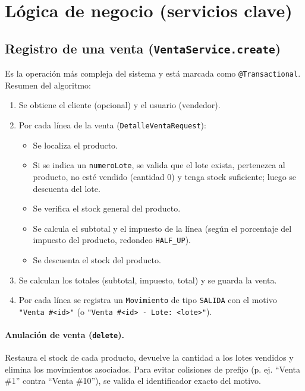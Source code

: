 \documentclass[11pt,a4paper]{article}
\begin{document}
\section{Lógica de negocio (servicios clave)}

\subsection{Registro de una venta (\texttt{VentaService.create})}

Es la operación más compleja del sistema y está marcada como
\texttt{@Transactional}. Resumen del algoritmo:

\begin{enumerate}[noitemsep]
    \item Se obtiene el cliente (opcional) y el usuario (vendedor).
    \item Por cada línea de la venta (\texttt{DetalleVentaRequest}):
    \begin{itemize}[noitemsep]
        \item Se localiza el producto.
        \item Si se indica un \texttt{numeroLote}, se valida que el lote
              exista, pertenezca al producto, no esté vendido (cantidad 0) y
              tenga stock suficiente; luego se descuenta del lote.
        \item Se verifica el stock general del producto.
        \item Se calcula el subtotal y el impuesto de la línea (según el
              porcentaje del impuesto del producto, redondeo
              \texttt{HALF\_UP}).
        \item Se descuenta el stock del producto.
    \end{itemize}
    \item Se calculan los totales (subtotal, impuesto, total) y se guarda la
          venta.
    \item Por cada línea se registra un \texttt{Movimiento} de tipo
          \texttt{SALIDA} con el motivo \texttt{"Venta \#<id>"} (o
          \texttt{"Venta \#<id> - Lote: <lote>"}).
\end{enumerate}

\paragraph{Anulación de venta (\texttt{delete}).} Restaura el stock de cada
producto, devuelve la cantidad a los lotes vendidos y elimina los movimientos
asociados. Para evitar colisiones de prefijo (p. ej. ``Venta \#1'' contra
``Venta \#10''), se valida el identificador exacto del motivo.
\end{document}
